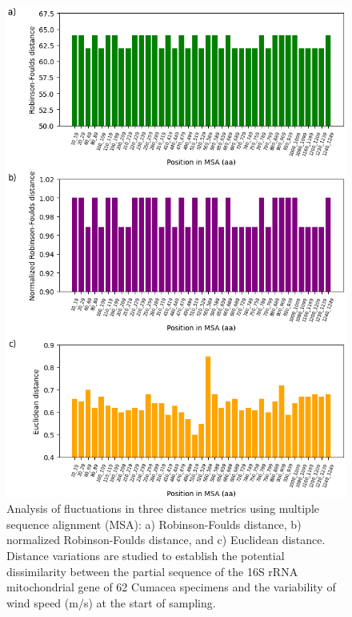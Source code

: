 \begin{figure}[htbp]
    \centering
    \includegraphics[width=\textwidth]{figure5.png}
     \caption{Analysis of fluctuations in three distance metrics using multiple sequence alignment (MSA): a) Robinson-Foulds distance, b) normalized Robinson-Foulds distance, and c) Euclidean distance. Distance variations are studied to establish the potential dissimilarity between the partial sequence of the 16S rRNA mitochondrial gene of 62 Cumacea specimens and the variability of wind speed (m/s) at the start of sampling. \label{fig:fig7}}
\end{figure}

